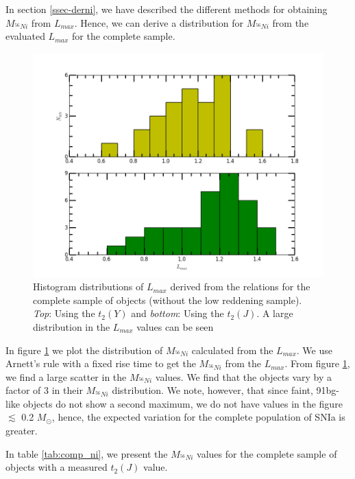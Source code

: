 In section \ref{ssec-derni}, we have described the different methods for obtaining $M_{^{56}Ni}$ from $L_{max}$. Hence, we can derive a distribution for $M_{^{56}Ni}$ from the evaluated $L_{max}$ for the complete sample. 
\begin{figure}
\includegraphics[width=.5\textwidth, trim= 0 30 0 30]{../plot_rel/lbol_yj_compsamp.png}
\caption{Histogram distributions of $L_{max}$ derived from the relations for the complete sample of objects (without the low reddening sample). \emph{Top}: Using the $t_2(Y)$ and \emph{bottom}: Using the $t_2(J)$. A large distribution in the $L_{max}$ values can be seen}
\label{fig:hist}
\end{figure}


In figure \ref{fig:hist} we plot the distribution of $M_{^{56}Ni}$ calculated from the $L_{max}$. We use Arnett's rule with a fixed rise time to get the $M_{^{56}Ni}$ from the $L_{max}$. From figure \ref{fig:hist}, we find a large scatter in the $M_{^{56}Ni}$ values. We find that the objects vary by a factor of 3 in their $M_{^{56}Ni}$ distribution. We note, however, that since faint, 91bg-like objects do not show a second maximum, we do not have values in the figure $\lesssim$ 0.2 $M_{\odot}$, hence, the expected variation for the complete population of SNIa is greater.  




In table \ref{tab:comp_ni}, we present the  $M_{^{56}Ni}$ values for the complete sample of objects with a measured $t_2(J)$ value. 

